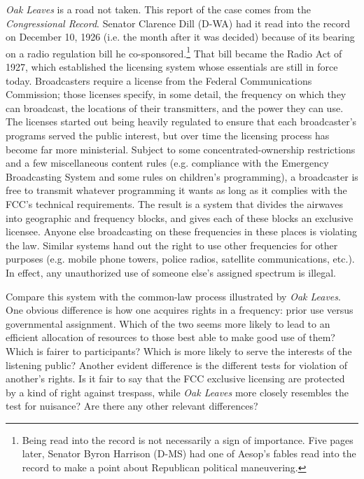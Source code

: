 

\item \textit{Oak Leaves} is a road not taken. This report of the case comes
from the \textit{Congressional Record}. Senator Clarence Dill (D-WA) had it
read into the record on December 10, 1926 (i.e. the month after it was decided)
because of its bearing on a radio regulation bill he
co-sponsored.\footnote{Being read into the record is not necessarily a sign of
importance. Five pages
later, Senator Byron Harrison (D-MS) had one of Aesop's fables read into the
record to make a point about Republican political maneuvering.} That bill
became the Radio Act of 1927, which established the licensing system whose
essentials are still in force today. Broadcasters require a license from the
Federal Communications Commission; those licenses specify, in some detail, the
frequency on which they can broadcast, the locations of their transmitters, and
the power they can use. The licenses started out being heavily regulated to
ensure that each broadcaster's programs served the public interest, but over
time the licensing process has become far more ministerial. Subject to some
concentrated-ownership restrictions and a few miscellaneous content rules (e.g.
compliance with the Emergency Broadcasting System and some rules on children's
programming), a broadcaster is free to transmit whatever programming it wants
as long as it complies with the FCC's technical requirements. The result is a
system that divides the airwaves into geographic and frequency blocks, and
gives each of these blocks an exclusive licensee. Anyone else broadcasting on
these frequencies in these places is violating the law.  Similar systems hand
out the right to use other frequencies for other purposes (e.g. mobile phone
towers, police radios, satellite communications, etc.). In effect, any
unauthorized use of someone else's assigned spectrum is illegal.

Compare this system with the common-law process illustrated by \textit{Oak
Leaves}. One obvious difference is how one acquires rights in a frequency: prior
use versus governmental assignment. Which of the two seems more likely to lead
to an efficient allocation of resources to those best able to make good use of
them? Which is fairer to participants? Which is more likely to serve the
interests of the listening public? Another evident difference is the different
tests for violation of another's rights. Is it fair to say that the FCC
exclusive licensing are protected by a kind of right against trespass, while
\textit{Oak Leaves} more closely resembles the test for nuisance? Are there any
other relevant differences?

